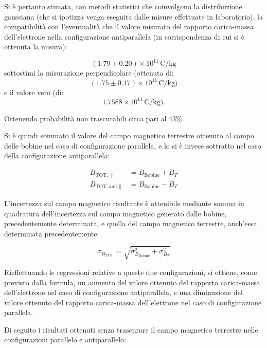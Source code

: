 \documentclass[a4paper,12pt]{article}
\begin{document}
Si è pertanto stimata, con metodi statistici che coinvolgono la distribuzione gaussiana (che si ipotizza venga eseguita dalle misure effettuate in laboratorio), la compatibilità con l’eventualità che il valore misurato del rapporto carica-massa dell’elettrone nella configurazione antiparallela (in corrispondenza di cui si è ottenuta la misura):

\[
(1.79 \pm 0.20) \times 10^{11} \, \text{C/kg}
\]
sottostimi la misurazione perpendicolare (ottenuta di:
\[
(1.75 \pm 0.17) \times 10^{11} \, \text{C/kg})
\]
e il valore vero (di:
\[
1.7588 \times 10^{11} \, \text{C/kg}).
\]

Ottenendo probabilità non trascurabili circa pari al \(43\%\).

Si è quindi sommato il valore del campo magnetico terrestre ottenuto al campo delle bobine nel caso di configurazione parallela, e lo si è invece sottratto nel caso della configurazione antiparallela:

\begin{align}
    B_{\text{TOT}, \parallel} &= B_{\text{Bobine}} + B_T \label{eq:B_tot_parallel} \\
    B_{\text{TOT}, \text{anti}\parallel} &= B_{\text{Bobine}} - B_T \label{eq:B_tot_antiparallel}
\end{align}

L’incertezza sul campo magnetico risultante è ottenibile mediante somma in quadratura dell’incertezza sul campo magnetico generato dalle bobine, precedentemente determinata, e quella del campo magnetico terrestre, anch’essa determinata precedentemente:

\begin{equation}
    \sigma_{B_{\text{TOT}}} = \sqrt{\sigma_{B_{\text{Bobine}}}^2 + \sigma_{B_T}^2} \label{eq:B_tot_uncertainty}
\end{equation}

Rieffettuando le regressioni relative a queste due configurazioni, si ottiene, come previsto dalla formula, un aumento del valore ottenuto del rapporto carica-massa dell’elettrone nel caso di configurazione antiparallela, e una diminuzione del valore ottenuto del rapporto carica-massa dell’elettrone nel caso di configurazione parallela.

Di seguito i risultati ottenuti senza trascurare il campo magnetico terrestre nelle configurazioni parallelo e antiparallelo:
\end{document}
